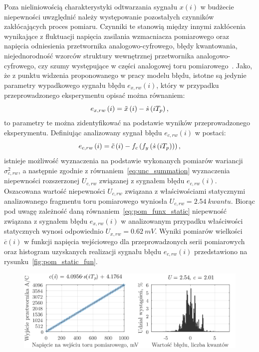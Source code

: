 Poza nieliniowością charakterystyki odtwarzania sygnału $x(i)$ w budżecie niepewności uwzględnić należy występowanie pozostałych czynników zakłócających proces pomiaru. Czynniki te stanowią między innymi zakłócenia wynikające z fluktuacji napięcia zasilania wzmacniacza pomiarowego oraz napięcia odniesienia przetwornika analogowo-cyfrowego, błędy kwantowania, niejednorodność wzorców struktury wewnętrznej przetwornika analogowo-cyfrowego, czy szumy występujące w części analogowej toru pomiarowego~\cite{stm_adc}. Jako, że z punktu widzenia proponowanego w pracy modelu błędu, istotne są jedynie parametry wypadkowego sygnału błędu $e_{x,rw}(i)$, który w przypadku przeprowadzonego eksperymentu opisać można równaniem:
\begin{equation}
e_{x,rw} \left(i\right) = \tilde{x} \left(i\right) - \dot{s} \left(iT_{p}\right) \label{eq:pom_funx_error},
\end{equation}
to parametry te można zidentyfikować na podstawie wyników przeprowadzonego eksperymentu. Definiując analizowany sygnał błędu $e_{c,rw}(i)$ w postaci:
\begin{equation}
e_{c,rw} \left(i\right) = \tilde{c} \left(i\right) - f_{c} \left(f_{y} \left(\dot{s} \left(iT_{p}\right)\right)\right) \label{eq:pom_func_error},
\end{equation}
istnieje możliwość wyznaczenia na podstawie wykonanych pomiarów wariancji $\sigma_{c,rw}^{2}$, a następnie zgodnie z równaniem~\eqref{eq:unc_summation} wyznaczenia niepewności rozszerzonej $U_{c,rw}$ związanej z sygnałem błędu $e_{c,rw}(i)$. Oszacowana wartość niepewności $U_{c,rw}$ związana z właściwościami statycznymi analizowanego fragmentu toru pomiarowego wyniosła $U_{c,rw} = \qty{2.54}{kwantu}$. Biorąc pod uwagę zależność daną równaniem~\eqref{eq:pom_funx_static} niepewność związana z sygnałem błędu $e_{x,rw}(i)$ w analizowanym przypadku właściwości statycznych wynosi odpowiednio $U_{x,rw} = \qty{0.62}{mV}$. Wyniki pomiarów wielkości $\overline{c}(i)$ w funkcji napięcia wejściowego dla przeprowadzonych serii pomiarowych oraz histogram uzyskanych realizacji sygnału błędu $e_{c,rw}(i)$ przedstawiono na rysunku~\ref{fig:pom_static_fun}.

\begin{figure}[htb!]
\begin{center}
\includegraphics{obrazki/static_adcout}
\end{center}
\end{figure}

